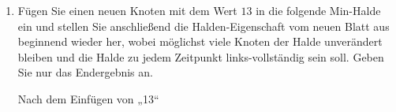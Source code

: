 \documentclass{bschlangaul-aufgabe}
\begin{document}
\begin{enumerate}

\begin{bAntwort}
\begin{minipage}{0.5\linewidth}
\end{minipage}
\begin{minipage}{0.5\linewidth}
\end{minipage}
\end{bAntwort}


\item Fügen Sie einen neuen Knoten mit dem Wert $13$ in die folgende
Min-Halde ein und stellen Sie anschließend die Halden-Eigenschaft vom
neuen Blatt aus beginnend wieder her, wobei möglichst viele Knoten der
Halde unverändert bleiben und die Halde zu jedem Zeitpunkt
links-vollständig sein soll. Geben Sie nur das Endergebnis an.

\begin{center}
\end{center}
\begin{bAntwort}

\begin{bBaum}{Nach dem Einfügen von „13“}

\end{bBaum}


\end{bAntwort}
\end{enumerate}
\end{document}
